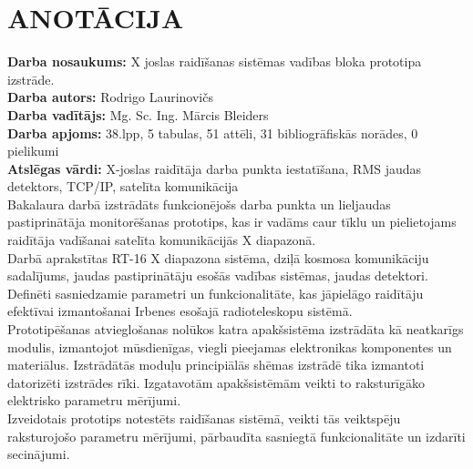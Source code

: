 \chapter*{ANOTĀCIJA}
\begin{flushleft}
\textbf{Darba nosaukums:} X joslas raidīšanas sistēmas vadības bloka prototipa izstrāde.\\
\textbf{Darba autors:} Rodrigo Laurinovičs\\
\textbf{Darba vadītājs:} Mg. Sc. Ing. Mārcis Bleiders\\
\textbf{Darba apjoms:} 38.lpp, 5 tabulas, 51 attēli, 31 bibliogrāfiskās norādes, 0 pielikumi\\
\textbf{Atslēgas vārdi:} X-joslas raidītāja darba punkta iestatīšana, RMS jaudas detektors, TCP/IP, satelīta komunikācija\\

Bakalaura darbā izstrādāts funkcionējošs darba punkta un lieljaudas pastiprinātāja monitorēšanas prototips, kas ir vadāms caur tīklu un pielietojams raidītāja vadīšanai satelīta komunikācijās X diapazonā.\\

Darbā aprakstītas RT-16 X diapazona sistēma, dziļā kosmosa komunikāciju sadalījums, jaudas pastiprinātāju esošās vadības sistēmas, jaudas detektori. Definēti sasniedzamie parametri un funkcionalitāte, kas jāpielāgo raidītāju efektīvai izmantošanai Irbenes esošajā radioteleskopu sistēmā.\\

Prototipēšanas atvieglošanas nolūkos katra apakšsistēma izstrādāta kā neatkarīgs modulis, izmantojot mūsdienīgas, viegli pieejamas elektronikas komponentes un materiālus. Izstrādātās moduļu principiālās shēmas izstrādē tika izmantoti datorizēti izstrādes rīki. Izgatavotām apakšsistēmām veikti to raksturīgāko elektrisko parametru mērījumi.\\

Izveidotais prototips notestēts raidīšanas sistēmā, veikti tās veiktspēju raksturojošo parametru mērījumi, pārbaudīta sasniegtā funkcionalitāte un izdarīti secinājumi.
\end{flushleft}

